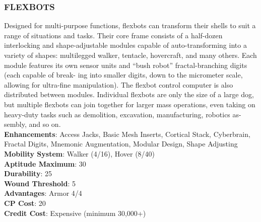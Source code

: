 \subsubsection{FLEXBOTS}
Designed for multi-purpose functions, flexbots can
transform their shells to suit a range of situations
and tasks. Their core frame consists of a half-dozen
interlocking and shape-adjustable modules capable
of auto-transforming into a variety of shapes: multilegged walker, tentacle, hovercraft, and many others.
Each module features its own sensor units and “bush
robot” fractal-branching digits (each capable of break-
ing into smaller digits, down to the micrometer scale,
allowing for ultra-fine manipulation). The flexbot
control computer is also distributed between modules.
Individual flexbots are only the size of a large dog, but
multiple flexbots can join together for larger mass
operations, even taking on heavy-duty tasks such as
demolition, excavation, manufacturing, robotics as-
sembly, and so on.
\\ \textbf{Enhancements}: Access Jacks, Basic Mesh Inserts, Cortical Stack, Cyberbrain, Fractal Digits, Mnemonic Augmentation, Modular Design, Shape Adjusting
\\ \textbf{Mobility System}: Walker (4/16), Hover (8/40)
\\ \textbf{Aptitude Maximum}: 30
\\ \textbf{Durability}: 25
\\ \textbf{Wound Threshold}: 5
\\ \textbf{Advantages}: Armor 4/4
\\ \textbf{CP Cost}: 20
\\ \textbf{Credit Cost}: Expensive (minimum 30,000+)

